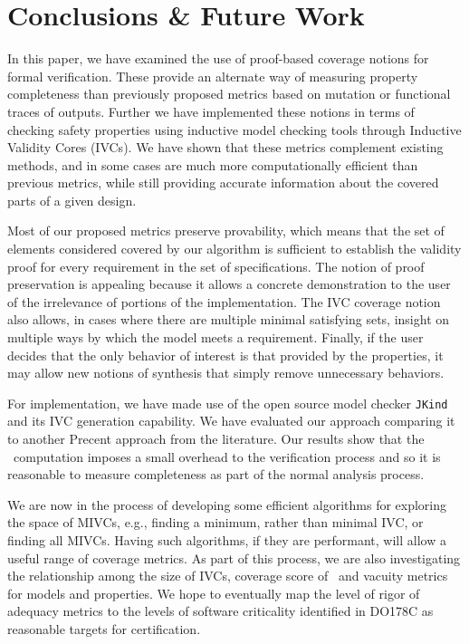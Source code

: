 \section{Conclusions \& Future Work}
\label{sec:conclusion}

In this paper, we have examined the use of proof-based coverage notions for formal verification.  These provide an alternate way of measuring property completeness than previously proposed metrics based on mutation or functional traces of outputs.
Further we have implemented these notions in terms of checking safety properties using inductive model checking tools through Inductive Validity Cores (IVCs).  We have shown that these metrics complement existing methods, and in some cases are much more computationally efficient than previous metrics, while still providing accurate information about the covered parts of a given design.

Most of our proposed metrics preserve provability, which means that the set of elements considered covered by our algorithm is sufficient to establish the validity proof for every requirement in the set of specifications.  The notion of proof preservation is appealing because it allows a concrete demonstration to the user of the irrelevance of portions of the implementation.  The IVC coverage notion also allows, in cases where there are multiple minimal satisfying sets, insight on multiple ways by which the model meets a requirement.
Finally, if the user decides that the only behavior of interest is that provided by the properties, it may allow new notions of synthesis that simply remove unnecessary behaviors.

For implementation, we have made use of the open source model checker \texttt{JKind} and its IVC generation capability. We have evaluated our approach comparing it to another Precent approach from the literature.  Our results show that the \ivccov\ computation imposes a small overhead to the verification process and so it is reasonable to measure completeness as part of the normal analysis process.

We are now in the process of developing some efficient algorithms for exploring the space of MIVCs, e.g., finding a minimum, rather than minimal IVC, or finding all MIVCs.  Having such algorithms, if they are performant, will allow a useful range of coverage metrics.  As part of this process, we are also investigating the relationship among the size of IVCs, coverage score of \ivccov\, and vacuity metrics for models and properties.  We hope to eventually map the level of rigor of adequacy metrics to the levels of software criticality identified in DO178C as reasonable targets for certification.

